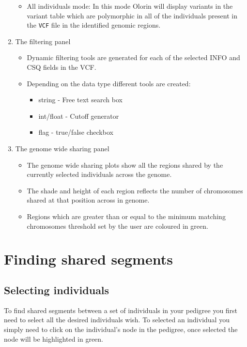\documentclass{article}
\begin{document}
\begin{enumerate}
\begin{itemize}
			\item{All individuals mode:} In this mode Olorin will display variants in the variant table which are polymorphic in all of the individuals present in the \texttt{VCF} file in the identified genomic regions.
		\end{itemize}	
	\item{The filtering panel}
		\begin{itemize}
			\item{Dynamic filtering tools are generated for each of the selected INFO and CSQ fields in the VCF.}
			\item{Depending on the data type different tools are created:}
				\begin{itemize}
					\item{string - Free text search box}
					\item{int/float - Cutoff generator}
					\item{flag - true/false checkbox}
				\end{itemize}
		\end{itemize}
	\item{The genome wide sharing panel}
		\begin{itemize}
			\item{The genome wide sharing plots show all the regions shared by the currently selected individuals across the genome.}
			\item{The shade and height of each region reflects the number of chromosomes shared at that position across in genome.}
			\item{Regions which are greater than or equal to the minimum matching chromosomes threshold set by the user are coloured in green.}
		\end{itemize}
\end{enumerate}

\section{Finding shared segments}
	\subsection{Selecting individuals}
			To find shared segments between a set of individuals in your pedigree you first need to select all the desired individuals wish. To selected an individual you simply need to click on the individual's node in the pedigree, once selected the node will be highlighted in green.\\
			
\end{document}
